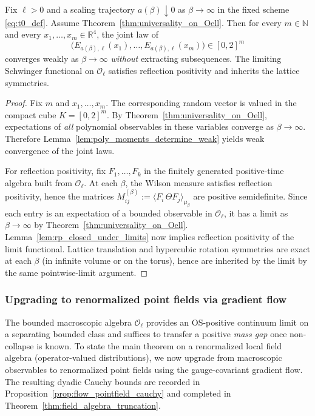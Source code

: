 \begin{theorem}
\label{thm:bounded_algebra_limit}
Fix $\ell>0$ and a scaling trajectory $a(\beta)\downarrow 0$ as $\beta\to\infty$ in the fixed scheme \eqref{eq:t0_def}.
Assume Theorem~\ref{thm:universality_on_Oell}.
Then for every $m\in\mathbb N$ and every $x_1,\dots,x_m\in\mathbb R^4$, the joint law of
\[
\bigl(E_{a(\beta),\ell}(x_1),\dots,E_{a(\beta),\ell}(x_m)\bigr)\in[0,2]^m
\]
converges weakly as $\beta\to\infty$ \emph{without} extracting subsequences.
The limiting Schwinger functional on $\mathcal O_{\ell}$ satisfies reflection positivity and inherits the lattice symmetries.
\end{theorem}

\begin{proof}
Fix $m$ and $x_1,\dots,x_m$.
The corresponding random vector is valued in the compact cube $K=[0,2]^m$.
By Theorem~\ref{thm:universality_on_Oell}, expectations of \emph{all} polynomial observables in these variables converge as $\beta\to\infty$.
Therefore Lemma~\ref{lem:poly_moments_determine_weak} yields weak convergence of the joint laws.

For reflection positivity, fix $F_1,\dots,F_k$ in the finitely generated positive-time algebra built from $\mathcal O_{\ell}$.
At each $\beta$, the Wilson measure satisfies reflection positivity, hence the matrices
$M^{(\beta)}_{ij}:=\langle F_i\,\Theta F_j\rangle_{\mu_{\beta}}$ are positive semidefinite.
Since each entry is an expectation of a bounded observable in $\mathcal O_{\ell}$, it has a limit as $\beta\to\infty$ by
Theorem~\ref{thm:universality_on_Oell}.
Lemma~\ref{lem:rp_closed_under_limits} now implies reflection positivity of the limit functional.
Lattice translation and hypercubic rotation symmetries are exact at each $\beta$ (in infinite volume or on the torus),
hence are inherited by the limit by the same pointwise-limit argument.
\end{proof}

\subsubsection{Upgrading to renormalized point fields via gradient flow}
\label{subsec:point_fields_flow}

The bounded macroscopic algebra $\mathcal O_{\ell}$ provides an OS-positive continuum limit on a separating bounded class and suffices to transfer a positive \emph{mass gap} once non-collapse is known.
To state the main theorem on a renormalized local field algebra (operator-valued distributions), we now upgrade from macroscopic observables to renormalized point fields using the gauge-covariant gradient flow.
The resulting dyadic Cauchy bounds are recorded in Proposition~\ref{prop:flow_pointfield_cauchy} and completed in Theorem~\ref{thm:field_algebra_truncation}.

